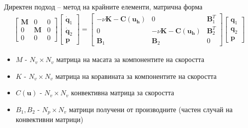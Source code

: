 \documentclass{beamer}
\begin{document}
    \begin{frame}{Директен подход -- метод на крайните елементи, матрична форма}
		\begin{multline*}
  \begin{bmatrix}
  \mathbf{M} & 0 & 0 \\
  0 & \mathbf{M} & 0 \\
  0 & 0 & 0
  \end{bmatrix}
  \begin{bmatrix}
  \dot{\mathbf{q}}_1\\
  \dot{\mathbf{q}}_2\\
  \mathbf{p}
  \end{bmatrix}
  =
  \begin{bmatrix}
  -\nu\mathbf{K} - \mathbf{C(u_h)} & 0 & \mathbf{B}^T_1 \\
  0 & -\nu\mathbf{K} - \mathbf{C(u_h)} & \mathbf{B}^T_2 \\
  \mathbf{B}_1 & \mathbf{B}_2 & 0
  \end{bmatrix}
  \begin{bmatrix}
  \mathbf{q}_1\\
  \mathbf{q}_2\\
  \mathbf{p}
  \end{bmatrix}
\end{multline*}
	\begin{itemize}
		\item $M$ - $N_v \times N_v$ матрица на масата за компонентите на скоростта
		\item $K$ - $N_v \times N_v$ матрица на коравината за компонентите на скоростта
		\item $C(\mathbf{u})$ - $N_v \times N_v$ конвективна матрица за скоростта
		\item $B_1, B_2$ - $N_p \times N_v$ матрици получени от производните (частен случай на конвективни матрици)
	\end{itemize}
    \end{frame}
\end{document}

